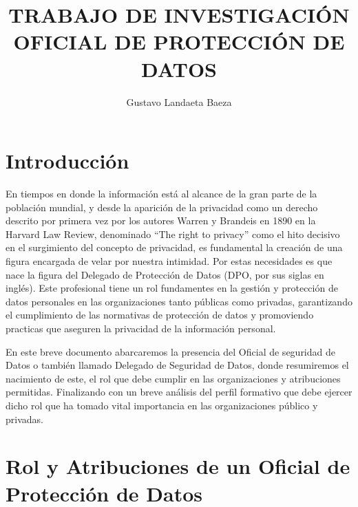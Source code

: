 \documentclass[stu, 11pt, letterpaper, donotrepeattitle, floatsintext, natbib]{apa7}
\title{\Large  TRABAJO DE INVESTIGACIÓN \\ OFICIAL DE PROTECCIÓN DE DATOS}
\author{Gustavo Landaeta Baeza } %
\begin{document}
\maketitle


\renewcommand\contentsname{\largeÍndice}
\tableofcontents
\setcounter{tocdepth}{2}
\newpage


\section{\large Introducción}

\justify

\hspace{1.27cm} En tiempos en donde la información está al alcance de la gran parte de la población mundial, y desde la aparición de la privacidad como un derecho descrito por primera vez por los autores Warren y Brandeis en 1890 en la Harvard Law
Review, denominado “The right to privacy” \citep{warren1995} como el hito decisivo en el surgimiento del concepto de privacidad, es fundamental la creación de una figura encargada de velar por nuestra intimidad. Por estas necesidades es que nace la figura del Delegado de Protección de Datos (DPO, por sus siglas en inglés). Este profesional tiene un rol fundamentes en la gestión y protección de datos personales en las organizaciones tanto públicas como privadas, garantizando el cumplimiento de las normativas de protección de datos y promoviendo practicas que aseguren la privacidad de la información personal.

En este breve documento abarcaremos la presencia del Oficial de seguridad de Datos o también llamado Delegado de Seguridad de Datos, donde resumiremos el nacimiento de este, el rol que debe cumplir en las organizaciones y atribuciones permitidas.  Finalizando con un breve análisis del perfil formativo que debe ejercer dicho rol que ha tomado vital importancia en las organizaciones público y privadas.

\hfill \break 


\newpage

\section{\large Rol y Atribuciones de un Oficial de Protección de Datos}
\end{document}
